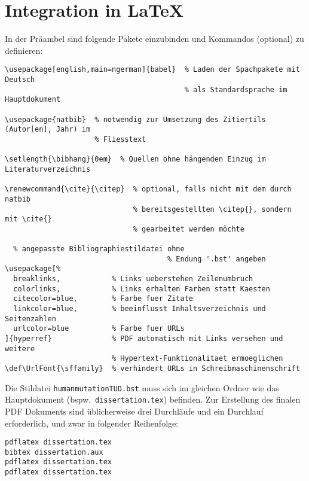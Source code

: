 \documentclass[a4paper,10pt]{scrartcl}
\renewcommand{\cite}{\citep}  %
\def\UrlFont{\sffamily}  %
\begin{document}
\section{Integration in \LaTeX}
In der Präambel sind folgende Pakete einzubinden und Kommandos (optional) zu
definieren:
\begin{singlespace}
\begin{Verbatim}[frame=single]
\usepackage[english,main=ngerman]{babel}  % Laden der Spachpakete mit Deutsch
                                          % als Standardsprache im Hauptdokument

\usepackage{natbib}  % notwendig zur Umsetzung des Zitiertils (Autor[en], Jahr) im
                     % Fliesstext

\setlength{\bibhang}{0em}  % Quellen ohne hängenden Einzug im Literaturverzeichnis

\renewcommand{\cite}{\citep}  % optional, falls nicht mit dem durch natbib
                              % bereitsgestellten \citep{}, sondern mit \cite{}
                              % gearbeitet werden möchte

  % angepasste Bibliographiestildatei ohne
                                      % Endung '.bst' angeben
\usepackage[%
  breaklinks,            % Links ueberstehen Zeilenumbruch
  colorlinks,            % Links erhalten Farben statt Kaesten
  citecolor=blue,        % Farbe fuer Zitate
  linkcolor=blue,        % beeinflusst Inhaltsverzeichnis und Seitenzahlen
  urlcolor=blue          % Farbe fuer URLs
]{hyperref}              % PDF automatisch mit Links versehen und weitere
                         % Hypertext-Funktionalitaet ermoeglichen
\def\UrlFont{\sffamily}  % verhindert URLs in Schreibmaschinenschrift
\end{Verbatim}
\end{singlespace}

Die Stildatei \verb|humanmutationTUD.bst| muss sich im gleichen Ordner wie
das Hauptdokument (bspw.\ \verb|dissertation.tex|) befinden. Zur Erstellung
des finalen PDF Dokuments sind üblicherweise drei  Durchläufe
und ein  Durchlauf erforderlich, und zwar in folgender
Reihenfolge:\\
\begin{center}
 \begin{minipage}{0.7\textwidth}
  \verb|pdflatex dissertation.tex|\\
  \verb|bibtex dissertation.aux|\\
  \verb|pdflatex dissertation.tex|\\
  \verb|pdflatex dissertation.tex|
 \end{minipage}
\end{center}
\end{document}
